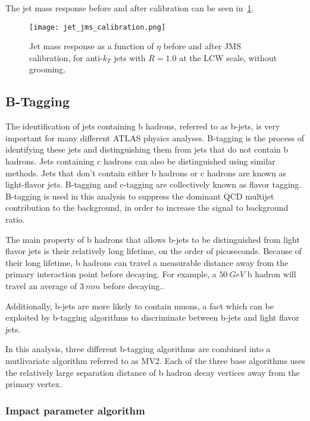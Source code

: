 The jet mass response before and after calibration can be seen in~\ref{fig:jet_jms_response}.

\begin{figure}[!ht]
    \centering
\texttt{[image: jet\_jms\_calibration.png]}
\caption{Jet mass response as a function of $\eta$ before and after JMS calibration, for anti-$k_T$ jets
with $R=1.0$ at the LCW scale, without grooming.}
\label{fig:jet_jms_response}
\end{figure}\cite{jet-substructure-perf}

\subsection{B-Tagging}\label{subsec:jet_b_tagging}

The identification of jets containing b hadrons, referred to as b-jets, is very important for many different ATLAS
physics analyses.
B-tagging is the process of identifying these jets and distinguishing them from jets that do not
contain b hadrons.
Jets containing c hadrons can also be distinguished using similar methods.
Jets that don't contain either b hadrons or c hadrons are known as light-flavor jets.
B-tagging and c-tagging are collectively known as flavor tagging.
B-tagging is used in this analysis to suppress the dominant QCD multijet contribution to the
background, in order to increase the signal to background ratio.

The main property of b hadrons that allows b-jets to be distinguished from light flavor jets is their relatively long
lifetime, on the order of picoseconds.
Because of their long lifetime, b hadrons can travel a measurable distance away from the primary interaction point
before decaying.
For example, a $50~GeV$ b hadron will travel an average of $3~mm$ before decaying.\cite{jet-bjet-perf}.

Additionally, b-jets are more likely to contain muons, a fact which can be exploited by b-tagging
algorithms to discriminate between b-jets and light flavor jets.\cite{jet-bjet-perf}

In this analysis, three different b-tagging algorithms are combined into a mutlivariate algorithm referred to as MV2.
Each of the three base algorithms uses the relatively large separation distance of b hadron decay vertices away
from the primary vertex.

\subsubsection{Impact parameter algorithm}\label{subsubsec:jet_btag_ip}

